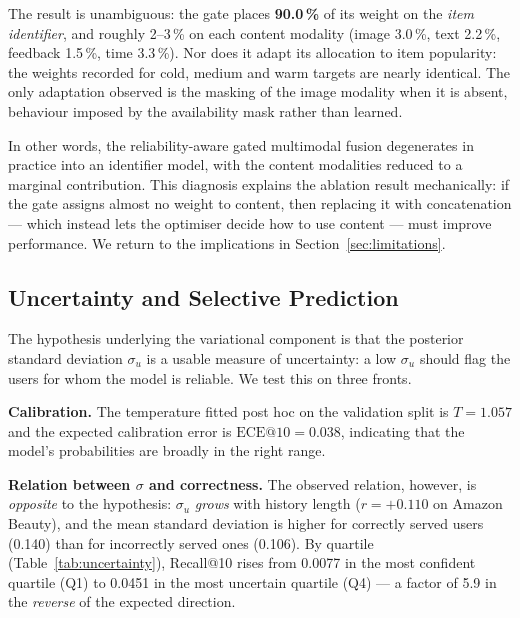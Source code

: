 The result is unambiguous: the gate places \textbf{90.0\,\%} of its weight on
the \emph{item identifier}, and roughly 2--3\,\% on each content modality (image
3.0\,\%, text 2.2\,\%, feedback 1.5\,\%, time 3.3\,\%). Nor does it adapt its
allocation to item popularity: the weights recorded for cold, medium and warm
targets are nearly identical. The only adaptation observed is the masking of the
image modality when it is absent, behaviour imposed by the availability mask
rather than learned.

In other words, the reliability-aware gated multimodal fusion degenerates in
practice into an identifier model, with the content modalities reduced to a
marginal contribution. This diagnosis explains the ablation result mechanically:
if the gate assigns almost no weight to content, then replacing it with
concatenation --- which instead lets the optimiser decide how to use content ---
must improve performance. We return to the implications in
Section~\ref{sec:limitations}.

\subsection{Uncertainty and Selective Prediction}
\label{sec:uncertainty}

The hypothesis underlying the variational component is that the posterior
standard deviation $\sigma_u$ is a usable measure of uncertainty: a low
$\sigma_u$ should flag the users for whom the model is reliable. We test this on
three fronts.

\textbf{Calibration.} The temperature fitted post hoc on the validation split is
$T=1.057$ and the expected calibration error is $\mathrm{ECE}@10 = 0.038$,
indicating that the model's probabilities are broadly in the right range.

\textbf{Relation between $\sigma$ and correctness.} The observed relation,
however, is \emph{opposite} to the hypothesis: $\sigma_u$ \emph{grows} with
history length ($r = +0.110$ on Amazon Beauty), and the mean standard deviation
is higher for correctly served users (0.140) than for incorrectly served ones
(0.106). By quartile (Table~\ref{tab:uncertainty}), Recall@10 rises from 0.0077
in the most confident quartile (Q1) to 0.0451 in the most uncertain quartile
(Q4) --- a factor of 5.9 in the \emph{reverse} of the expected direction.

